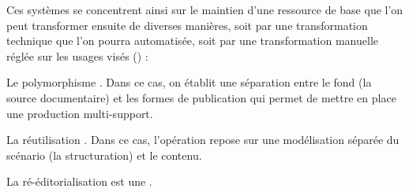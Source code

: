 Ces systèmes se concentrent ainsi sur le maintien d'une ressource de base que l'on peut transformer ensuite de diverses manières, soit par une transformation technique que l'on pourra automatisée, soit par une transformation manuelle réglée sur les usages visés (\cite{Crozat2011}) : 
\begin{liste}
	\item Le polymorphisme . Dans ce cas, on établit une séparation entre le fond (la source documentaire) et les formes de publication qui permet de mettre en place une production multi-support.

	\item La réutilisation . Dans ce cas, l'opération repose sur une modélisation séparée du scénario (la structuration) et le contenu.

	\item La ré-éditorialisation est une .

\end{liste}


